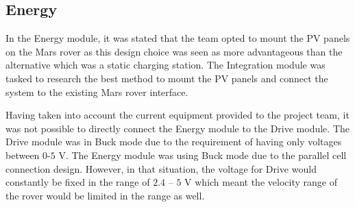 \documentclass[11pt, a4paper]{article}
\begin{document}
\subsection{Energy}

In the Energy module, it was stated that the team opted to mount the PV panels on the Mars rover as this design choice was seen as more advantageous than the alternative which was a static charging station. The Integration module was tasked to research the best method to mount the PV panels and connect the system to the existing Mars rover interface. 

Having taken into account the current equipment provided to the project team, it was not possible to directly connect the Energy module to the Drive module. The Drive module was in Buck mode due to the requirement of having only voltages between $0$-$5$ V. The Energy module was using Buck mode due to the parallel cell connection design. However, in that situation, the voltage for Drive would constantly be fixed in the range of $2.4$ – $5$ V which meant the velocity range of the rover would be limited in the range as well.
\end{document}
